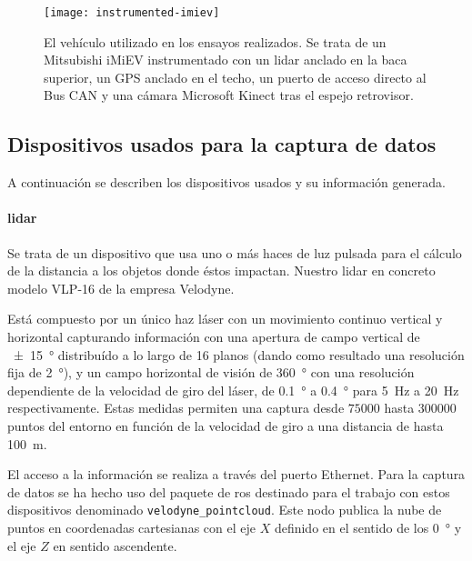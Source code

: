 \begin{figure}[t]
	\centering
	\texttt{[image: instrumented-imiev]}
	\caption[Vehículo instrumentado utilizado en los ensayos]{El vehículo utilizado en los ensayos realizados. Se trata de un Mitsubishi iMiEV instrumentado con un \acrshort{lidar} anclado en la baca superior, un GPS anclado en el techo, un puerto de acceso directo al Bus CAN y una cámara Microsoft Kinect tras el espejo retrovisor.}
	\label{fig:instrumented-imiev}
\end{figure}

\subsection{Dispositivos usados para la captura de datos}

A continuación se describen los dispositivos usados y su información generada.

\paragraph{\acrshort{lidar}}

Se trata de un dispositivo que usa uno o más haces de luz pulsada para el cálculo de la distancia a los objetos donde éstos impactan. Nuestro \acrshort{lidar} en concreto modelo VLP-16 de la empresa Velodyne.

Está compuesto por un único haz láser con un movimiento continuo vertical y horizontal capturando información con una apertura de campo vertical de \SI{\pm15}{\degree} distribuído a lo largo de 16 planos (dando como resultado una resolución fija de \SI{2}{\degree}), y un campo horizontal de visión de \SI{360}{\degree} con una resolución dependiente de la velocidad de giro del láser, de \SI{0.1}{\degree} a \SI{0.4}{\degree} para \SI{5}{\Hz} a \SI{20}{\Hz} respectivamente. Estas medidas permiten una captura desde $75000$ hasta $300000$ puntos del entorno en función de la velocidad de giro a una distancia de hasta \SI{100}{\meter}.

El acceso a la información se realiza a través del puerto Ethernet. Para la captura de datos se ha hecho uso del paquete de \ac{ros} destinado para el trabajo con estos dispositivos denominado \texttt{velodyne\_pointcloud}. Este nodo publica la nube de puntos en coordenadas cartesianas con el eje $X$ definido en el sentido de los \SI{0}{\degree} y el eje $Z$ en sentido ascendente.

